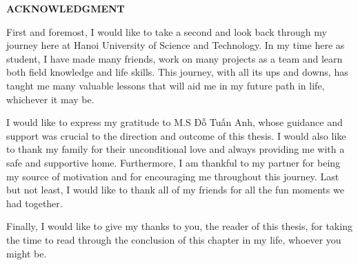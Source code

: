 \begin{center}
  \Large{\textbf{ACKNOWLEDGMENT}}\\
\end{center}
\vspace{1cm}

First and foremost, I would like to take a second and look back through my journey here at Hanoi University of Science and Technology. In my time here as student, I have made many friends, work on many projects as a team and learn both field knowledge and life skills. This journey, with all its ups and downs, has taught me many valuable lessons that will aid me in my future path in life, whichever it may be.

I would like to express my gratitude to M.S Đỗ Tuấn Anh, whose guidance and support was crucial to the direction and outcome of this thesis. I would also like to thank my family for their unconditional love and always providing me with a safe and supportive home. Furthermore, I am thankful to my partner for being my source of motivation and for encouraging me throughout this journey. Last but not least, I would like to thank all of my friends for all the fun moments we had together.

Finally, I would like to give my thanks to you, the reader of this thesis, for taking the time to read through the conclusion of this chapter in my life, whoever you might be.
